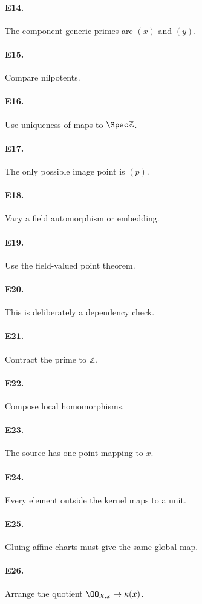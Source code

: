 \paragraph{E14.} The component generic primes are $(x)$ and $(y)$.
\paragraph{E15.} Compare nilpotents.
\paragraph{E16.} Use uniqueness of maps to $\Spec\mathbb Z$.
\paragraph{E17.} The only possible image point is $(p)$.
\paragraph{E18.} Vary a field automorphism or embedding.
\paragraph{E19.} Use the field-valued point theorem.
\paragraph{E20.} This is deliberately a dependency check.
\paragraph{E21.} Contract the prime to $\mathbb Z$.
\paragraph{E22.} Compose local homomorphisms.
\paragraph{E23.} The source has one point mapping to $x$.
\paragraph{E24.} Every element outside the kernel maps to a unit.
\paragraph{E25.} Gluing affine charts must give the same global map.
\paragraph{E26.} Arrange the quotient $\OO_{X,x}\to\kappa(x)$.
